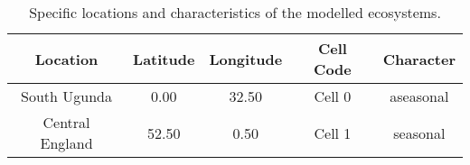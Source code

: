 \begin{table}[htb!]
\centering
\caption[Specific locations and characteristics of the modelled ecosystems]{Specific locations and characteristics of the modelled ecosystems.} 
\label{tab:mat:exp:loc}
\begin{tabular*}{\textwidth}{@{\extracolsep{\fill} } ccccc}
  \toprule
\textbf{Location} & \textbf{Latitude} & \textbf{Longitude} & \textbf{Cell Code} & \textbf{Character} \\ 
  \midrule
South Ugunda & 0.00 & 32.50 & Cell 0 & aseasonal \\ 
  Central England & 52.50 & 0.50 & Cell 1 & seasonal \\ 
   \bottomrule
\end{tabular*}
\end{table}
